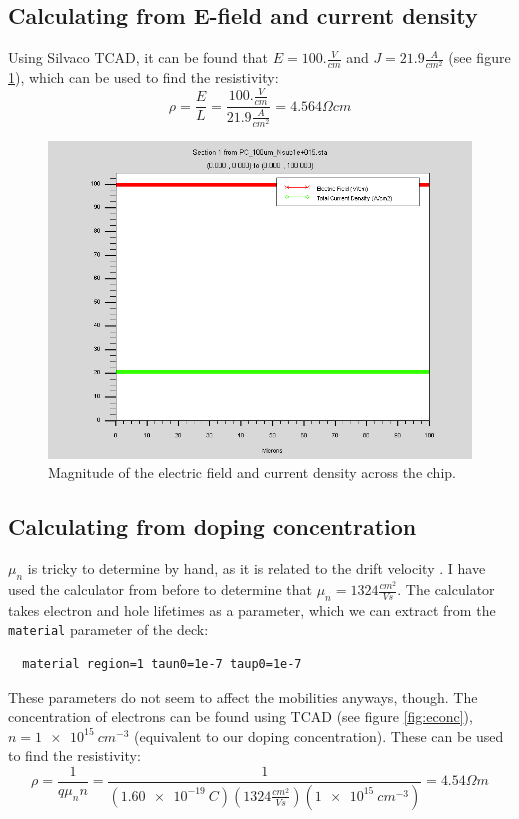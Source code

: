 \documentclass[12pt]{article}
\begin{document}
\subsection{Calculating from E-field and current density}
Using Silvaco TCAD, it can be found that $E=100.\frac{V}{cm}$ and $J=21.9\frac{A}{cm^2}$ (see figure \ref{fig:efieldcurrentdensity}), which can be used to find the resistivity:
\begin{equation}
  \rho=\frac{E}{L}=\frac{100.\frac{V}{cm}}{21.9\frac{A}{cm^2}}=4.564{\Omega}cm
\end{equation}
\begin{figure}[H]
  \centering
  \includegraphics[width=\textwidth]{efieldcurrentdensity}
  \caption{Magnitude of the electric field and current density across the chip.}
  \label{fig:efieldcurrentdensity}
\end{figure}

\subsection{Calculating from doping concentration}
$\mu_n$ is tricky to determine by hand, as it is related to the drift velocity \citep{wikipedia_mobility}. I have used the calculator from before to determine that $\mu_n=1324\frac{cm^2}{Vs}$. The calculator takes electron and hole lifetimes as a parameter, which we can extract from the \lstinline{material} parameter of the deck:
\begin{lstlisting}
  material region=1 taun0=1e-7 taup0=1e-7
\end{lstlisting}
These parameters do not seem to affect the mobilities anyways, though. The concentration of electrons can be found using TCAD (see figure \ref{fig:econc}), $n=\SI{1e15}{cm^{-3}}$ (equivalent to our doping concentration). These can be used to find the resistivity:
\begin{equation}
  \rho=\frac{1}{q\mu_nn}=\frac{1}{(\SI{1.60e-19}{C})(1324\frac{cm^2}{Vs})(\SI{1e15}{cm^{-3}})}=4.54{\Omega}m
\end{equation}
\end{document}
